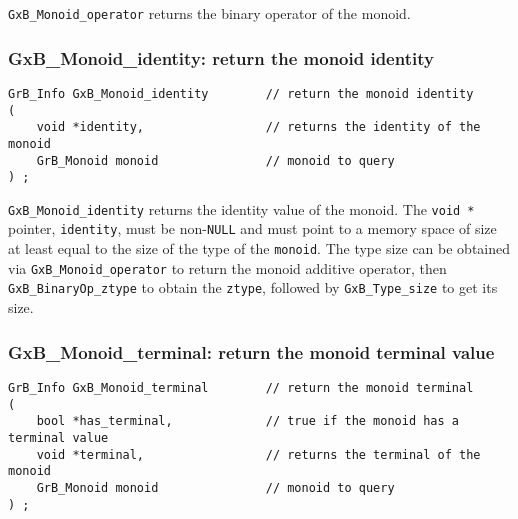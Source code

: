 \documentclass[12pt]{article}
\begin{document}
{\verb'GxB_Monoid_operator' returns the binary operator of the monoid.

\subsubsection{{\sf GxB\_Monoid\_identity:} return the monoid identity}
\label{monoid_identity}

\begin{mdframed}[userdefinedwidth=6in]
{\footnotesize
\begin{verbatim}
GrB_Info GxB_Monoid_identity        // return the monoid identity
(
    void *identity,                 // returns the identity of the monoid
    GrB_Monoid monoid               // monoid to query
) ;
\end{verbatim}
} \end{mdframed}

\verb'GxB_Monoid_identity' returns the identity value of the monoid.  The
\verb'void *' pointer, \verb'identity', must be non-\verb'NULL' and must point
to a memory space of size at least equal to the size of the type of the
\verb'monoid'.  The type size can be obtained via \verb'GxB_Monoid_operator' to
return the monoid additive operator, then \verb'GxB_BinaryOp_ztype' to obtain
the \verb'ztype', followed by \verb'GxB_Type_size' to get its size.

\newpage
\subsubsection{{\sf GxB\_Monoid\_terminal:} return the monoid terminal value}
\label{monoid_terminal}

\begin{mdframed}[userdefinedwidth=6in]
{\footnotesize
\begin{verbatim}
GrB_Info GxB_Monoid_terminal        // return the monoid terminal
(
    bool *has_terminal,             // true if the monoid has a terminal value
    void *terminal,                 // returns the terminal of the monoid
    GrB_Monoid monoid               // monoid to query
) ;
\end{verbatim}
} \end{mdframed}

}
\end{document}
